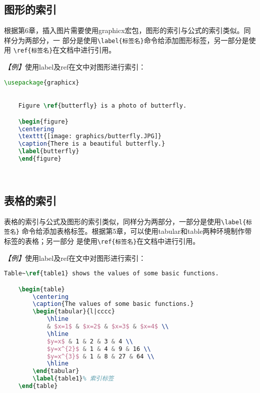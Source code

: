 \subsection{图形的索引}

根据第6章，插入图片需要使用graphicx宏包，图形的索引与公式的索引类似。同样分为两部分，一
部分是使用\texttt{\textbackslash{}label\{标签名\}}命令给添加图形标签，另一部分是使用
\texttt{\textbackslash{}ref\{标签名\}}在文档中进行引用。

\emph{【例】}使用label及ref在文中对图形进行索引：
\begin{lstlisting}[language=TeX]
    \usepackage{graphicx}
    

    Figure \ref{butterfly} is a photo of butterfly.

    \begin{figure}
    \centering
    \texttt{[image: graphics/butterfly.JPG]}
    \caption{There is a beautiful butterfly.}
    \label{butterfly}
    \end{figure}

    
\end{lstlisting}

\subsection{表格的索引}

表格的索引与公式及图形的索引类似，同样分为两部分，一部分是使用\texttt{\textbackslash{}label\{标签名\}}
命令给添加表格标签。根据第5章，可以使用tabular和table两种环境制作带标签的表格；另一部分
是使用\texttt{\textbackslash{}ref\{标签名\}}在文档中进行引用。

\emph{【例】}使用label及ref在文中对图形进行索引：
\begin{lstlisting}[language=TeX]
    Table~\ref{table1} shows the values of some basic functions.

    \begin{table}
        \centering
        \caption{The values of some basic functions.}
        \begin{tabular}{l|cccc}
            \hline
            & $x=1$ & $x=2$ & $x=3$ & $x=4$ \\
            \hline
            $y=x$ & 1 & 2 & 3 & 4 \\
            $y=x^{2}$ & 1 & 4 & 9 & 16 \\
            $y=x^{3}$ & 1 & 8 & 27 & 64 \\
            \hline
        \end{tabular}
        \label{table1}% 索引标签
    \end{table}
\end{lstlisting}


